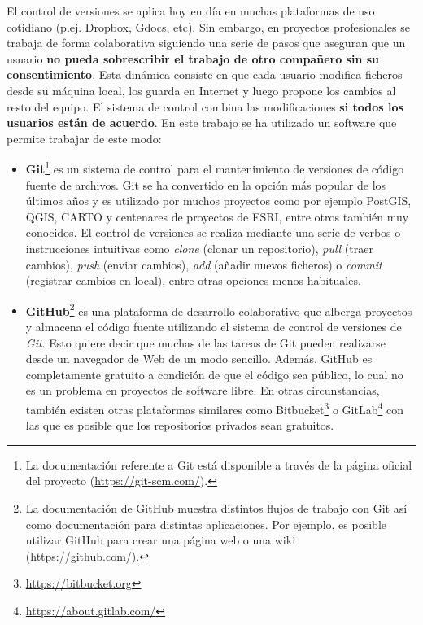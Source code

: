 El control de versiones se aplica hoy en día en muchas plataformas de uso cotidiano (p.ej. Dropbox, Gdocs, etc). Sin embargo, en proyectos profesionales se trabaja de forma colaborativa siguiendo una serie de pasos que aseguran que un usuario \textbf{no pueda sobrescribir el trabajo de otro compañero sin su consentimiento}. Esta dinámica consiste en que cada usuario modifica ficheros desde su máquina local, los guarda en Internet y luego propone los cambios al resto del equipo. El sistema de control combina las modificaciones \textbf{si todos los usuarios están de acuerdo}. En este trabajo se ha utilizado un software que permite trabajar de este modo:

\begin{itemize}
\item\textbf{Git}\footnote{La documentación referente a Git está disponible a través de la página oficial del proyecto (\url{https://git-scm.com/}).} es un sistema de control para el mantenimiento de versiones de código fuente de archivos. Git se ha convertido en la opción más popular de los últimos años y es utilizado por muchos proyectos como por ejemplo PostGIS, QGIS, CARTO y centenares de proyectos de ESRI, entre otros también muy conocidos. El control de versiones se realiza mediante una serie de verbos o instrucciones intuitivas como \textit{clone} (clonar un repositorio), \textit{pull} (traer cambios), \textit{push} (enviar cambios), \textit{add} (añadir nuevos ficheros) o \textit{commit} (registrar cambios en local), entre otras opciones menos habituales.
\item\textbf{GitHub}\footnote{La documentación de GitHub muestra distintos flujos de trabajo con Git así como documentación para distintas aplicaciones. Por ejemplo, es posible utilizar GitHub para crear una página web o una wiki (\url{https://github.com/}).} es una plataforma de desarrollo colaborativo que alberga proyectos y almacena el código fuente utilizando el sistema de control de versiones de \textit{Git}. Esto quiere decir que muchas de las tareas de Git pueden realizarse desde un navegador de Web de un modo sencillo. Además, GitHub es completamente gratuito a condición de que el código sea público, lo cual no es un problema en proyectos de software libre. En otras circunstancias, también existen otras plataformas similares como Bitbucket\footnote{\href{https://bitbucket.org}{https://bitbucket.org}} o GitLab\footnote{\href{https://about.gitlab.com/}{https://about.gitlab.com/}} con las que es posible que los repositorios privados sean gratuitos.
\end{itemize}

